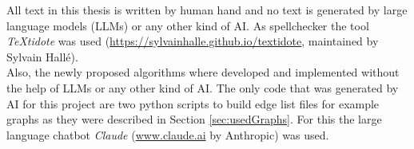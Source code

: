 \documentclass[final,oneside]{vutinfth}
\begin{document}
	
	\tableofcontents %
	
	\mainmatter
	
	
	
	

	
	
	
	
	
	
	
	

	
	
	\backmatter
	
	\begin{aitools}
		All text in this thesis is written by human hand and no text is generated by large language models (LLMs) or any other kind of AI. As spellchecker the tool \emph{TeXtidote} was used (\url{https://sylvainhalle.github.io/textidote}, maintained by Sylvain Hallé). \\
		Also, the newly proposed algorithms where developed and implemented without the help of LLMs or any other kind of AI. The only code that was generated by AI for this project are two python scripts to build edge list files for example graphs as they were described in Section \ref{sec:usedGraphs}. For this the large language chatbot \emph{Claude} (\url{www.claude.ai} by Anthropic) was used. 
	\end{aitools}
	
	\listoffigures %
	
	\cleardoublepage %
	\listoftables %
	
	
	\printindex %
	
	
	
	

	

	
\end{document}
